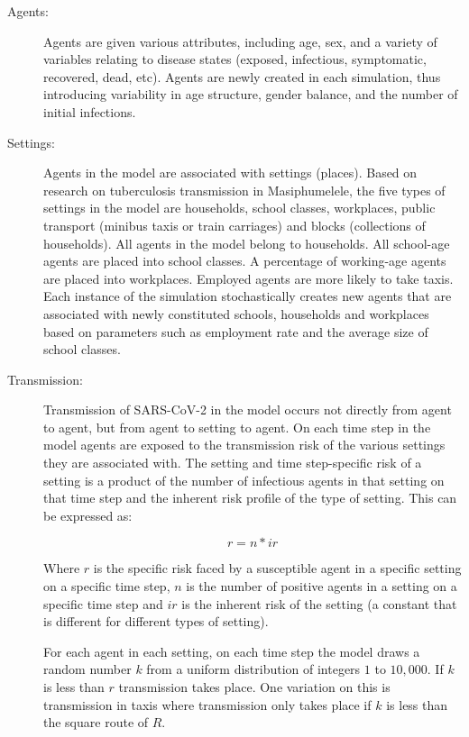 \documentclass{article}
\begin{document}
\begin{description}

\item[Agents:] Agents are given various attributes, including age, sex, and a
  variety of variables relating to disease states (exposed, infectious,
  symptomatic, recovered, dead, etc). Agents are newly created in each
  simulation, thus introducing variability in age structure, gender balance, and
  the number of initial infections.

\item[Settings:] Agents in the model are associated with settings
  (places). Based on research on tuberculosis transmission in Masiphumelele, the
  five types of settings in the model are households, school classes,
  workplaces, public transport (minibus taxis or train carriages) and blocks
  (collections of households).\cite{Andrews2014} All agents in the model belong
  to households. All school-age agents are placed into school classes. A
  percentage of working-age agents are placed into workplaces. Employed agents
  are more likely to take taxis. Each instance of the simulation stochastically
  creates new agents that are associated with newly constituted schools,
  households and workplaces based on parameters such as employment rate and the
  average size of school classes.

\item[Transmission:] Transmission of SARS-CoV-2 in the model occurs not directly
  from agent to agent, but from agent to setting to agent. On each time step in
  the model agents are exposed to the transmission risk of the various settings
  they are associated with. The setting and time step-specific risk of a setting
  is a product of the number of infectious agents in that setting on that time
  step and the inherent risk profile of the type of setting. This can be
  expressed as:

  \begin{equation*}
    r = n * ir
  \end{equation*}

  Where $r$ is the specific risk faced by a susceptible agent in a specific
  setting on a specific time step, $n$ is the number of positive agents in a
  setting on a specific time step and $ir$ is the inherent risk of the setting (a
  constant that is different for different types of setting).

  For each agent in each setting, on each time step the model draws a random
  number $k$ from a uniform distribution of integers $1$ to $10,000$. If $k$ is less
  than $r$ transmission takes place. One variation on this is transmission in
  taxis where transmission only takes place if $k$ is less than the square route
  of $R$.


\end{description}
\end{document}
